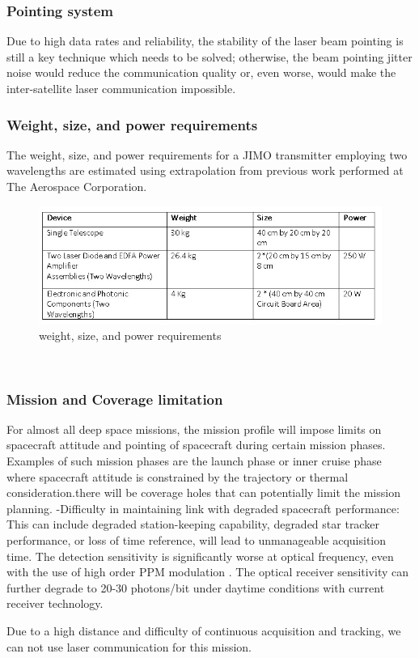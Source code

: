 \subsubsection{Pointing system}
Due to high data rates and reliability, the stability of the laser beam pointing is still a key technique which needs to be solved; otherwise, the beam pointing jitter noise would reduce the communication quality or, even worse, would make the inter-satellite laser communication impossible. 
\subsubsection{Weight, size, and power requirements}
The weight, size, and power requirements for a JIMO transmitter employing two wavelengths are estimated using extrapolation from previous work performed at The Aerospace Corporation.
\begin{figure}[!htb]
	\begin{center}
	\includegraphics[width=1\columnwidth]{figures/laser-communication/bh11.jpg}
	\caption{weight, size, and power requirements}
	\end{center}
\end{figure}
\\
\subsubsection{Mission and Coverage limitation}
For almost all deep space missions, the mission profile will impose limits on spacecraft attitude and pointing of spacecraft during certain mission phases. Examples of such mission phases are the launch phase or inner cruise phase where spacecraft attitude is constrained by the trajectory or thermal consideration.there will be coverage holes that can potentially limit the mission planning.
-Difficulty in maintaining link with degraded spacecraft performance: This can include degraded station-keeping capability, degraded star tracker performance, or loss of time reference, will lead to unmanageable acquisition time.
The detection sensitivity is significantly worse at optical frequency, even with the use of high order PPM modulation . The optical receiver sensitivity can further degrade to 20-30 photons/bit under daytime conditions with current receiver technology.

Due to a high distance and difficulty of continuous acquisition and tracking, we can not use laser communication for this mission.
